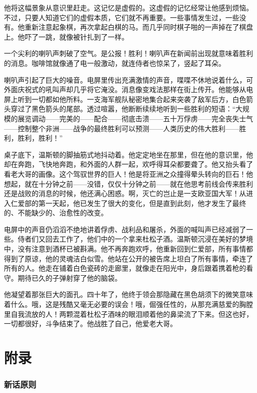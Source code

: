 他将这幅景象从意识里赶走。这记忆是虚假的。这虚假的记忆经常让他感到烦恼。不过，只要人知道它们的虚假本质，它们就不再重要。一些事情发生过，一些没有。他重新注意起象棋，再次拿起白棋的马。而几乎同时棋子啪的一声掉在了棋盘上。他吓了一跳，就像被针扎到了一样。

一个尖利的喇叭声刺破了空气。是公报！胜利！喇叭声在新闻前出现就意味着胜利的消息。咖啡馆就像通了电一般激动，就连侍者也惊呆了，竖起了耳朵。

喇叭声引起了巨大的噪音。电屏里传出充满激情的声音，喋喋不休地说着什么，可外面庆祝式的吼叫声却几乎将它淹没。消息像变戏法那样在街上传开。他能够从电屏上听到一切都如他所料。一支海军舰队秘密地集合起来突袭了敌军后方，白色箭头穿过了黑色箭头的尾部。透过喧嚣，他断断续续地听到一些胜利的短语：``大规模的展览调动——完美的——配合——彻底击溃——五十万俘虏——完全丧失士气——控制整个非洲——战争的最终胜利可以预测——人类历史的伟大胜利——胜利，胜利，胜利！''

桌子底下，温斯顿的脚抽筋式地抖动着。他定定地坐在那里，但在他的意识里，他却在奔跑，飞快地奔跑，和外面的人群一起，欢呼得耳朵都要聋了。他又抬头看了看老大哥的画像。这个驾驭世界的巨人！他是将亚洲之众撞得晕头转向的巨石！他想起，就在十分钟之前——没错，仅仅十分钟之前——就在他思考前线会传来胜利还是战败的消息的时候，他还满心困惑。啊，灭亡的岂止是一支欧亚国大军！从进入仁爱部的第一天起，他已发生了很大的变化，但是直到此刻，他才发生了最终的、不能缺少的、治愈性的改变。

电屏中的声音仍滔滔不绝地讲着俘虏、战利品和屠杀，外面的喊叫声已经减弱了一些。侍者们又回去工作了，他们中的一个拿来杜松子酒。温斯顿沉浸在美好的梦境中，没有注意到酒杯已被斟满。他不再奔跑欢呼，他重新回到仁爱部，所有事情都得到了原谅，他的灵魂洁白似雪。他站在公开的被告席上坦白了所有事情，牵连了所有的人。他走在铺着白色瓷砖的走廊里，就像走在阳光中，身后跟着携着枪的看守。期待已久的子弹射穿了他的脑袋。

他凝望着那张巨大的面孔。四十年了，他终于领会那隐藏在黑色胡须下的微笑意味着什么。哦，这是残酷又毫无必要的误会！哦，倔强任性的，从那充满慈爱的胸膛里自我流放的人！两颗混着杜松子酒味的眼泪顺着他的鼻梁流了下来。但这也好，一切都很好，斗争结束了。他战胜了自己，他爱老大哥。

\part*{附录}

\section*{新话原则}\label{ux65b0ux8bddux539fux5219}

